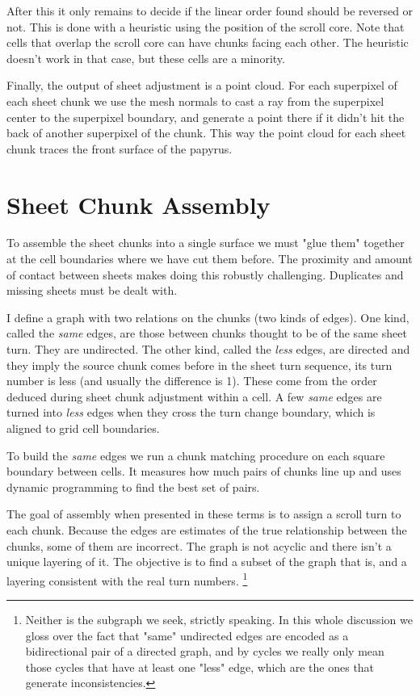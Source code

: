 \documentclass{article}
\begin{document}
After this it only remains to decide if the linear order found should be reversed or not. This is done with a heuristic using the position of the scroll core. Note that cells that overlap the scroll core can have chunks facing each other. The heuristic doesn't work in that case, but these cells are a minority.

Finally, the output of sheet adjustment is a point cloud. For each superpixel of each sheet chunk we use the mesh normals to cast a ray from the superpixel center to the superpixel boundary, and generate a point there if it didn't hit the back of another superpixel of the chunk. This way the point cloud for each sheet chunk traces the front surface of the papyrus.


\section{Sheet Chunk Assembly}

To assemble the sheet chunks into a single surface we must "glue them" together at the cell boundaries where we have cut them before. The proximity and amount of contact between sheets makes doing this robustly challenging. Duplicates and missing sheets must be dealt with.

I define a graph with two relations on the chunks (two kinds of edges). One kind, called the \emph{same} edges, are those between chunks thought to be of the same sheet turn. They are undirected. The other kind, called the \emph{less} edges, are directed and they imply the source chunk comes before in the sheet turn sequence, its turn number is less (and usually the difference is 1). These come from the order deduced during sheet chunk adjustment within a cell. A few \emph{same} edges are turned into \emph{less} edges when they cross the turn change boundary, which is aligned to grid cell boundaries.

To build the \emph{same} edges we run a chunk matching procedure on each square boundary between cells. It measures how much pairs of chunks line up and uses dynamic programming to find the best set of pairs.

The goal of assembly when presented in these terms is to assign a scroll turn to each chunk. Because the edges are estimates of the true relationship between the chunks, some of them are incorrect. The graph is not acyclic and there isn't a unique layering of it. The objective is to find a subset of the graph that is, and a layering consistent with the real turn numbers. \footnote{Neither is the subgraph we seek, strictly speaking. In this whole discussion we gloss over the fact that "same" undirected edges are encoded as a bidirectional pair of a directed graph, and by cycles we really only mean those cycles that have at least one "less" edge, which are the ones that generate inconsistencies.}
\end{document}
